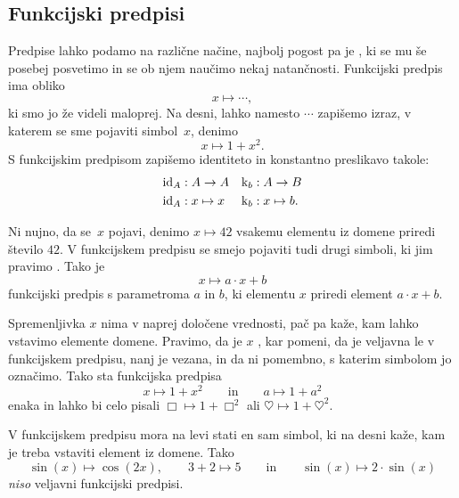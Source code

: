 \subsection{Funkcijski predpisi}
\label{sec:funkcijski-predpisi}

Predpise lahko podamo na različne načine, najbolj pogost pa je , ki
se mu še posebej posvetimo in se ob njem naučimo nekaj natančnosti. Funkcijski predpis ima
obliko
%
\begin{equation*}
  x \mapsto \cdots,
\end{equation*}
%
ki smo jo že videli maloprej. Na desni, lahko namesto $\cdots$ zapišemo izraz, v katerem
se sme pojaviti simbol~$x$, denimo
%
\begin{equation*}
  x \mapsto 1 + x^2.
\end{equation*}
%
S funkcijskim predpisom zapišemo identiteto in konstantno preslikavo takole:
%
\begin{align*}
  \id[A] &: A \to A
  &
  \konst{b} &: A \to B
  \\
  \id[A] &: x \mapsto x
  &
  \konst{b} &: x \mapsto b.
\end{align*}

Ni nujno, da se~$x$ pojavi, denimo $x \mapsto 42$ vsakemu elementu iz domene priredi
število $42$. V funkcijskem predpisu se smejo pojaviti tudi drugi simboli, ki jim
pravimo . Tako je
%
\begin{equation*}
  x \mapsto a \cdot x + b
\end{equation*}
%
funkcijski predpis s parametroma $a$ in $b$, ki elementu $x$ priredi element $a \cdot x + b$.

Spremenljivka $x$ nima v naprej določene vrednosti, pač pa kaže, kam lahko vstavimo
elemente domene. Pravimo, da je $x$ , kar pomeni, da je veljavna
le v funkcijskem predpisu, nanj je vezana, in da ni pomembno, s katerim simbolom jo
označimo. Tako sta funkcijska predpisa
%
\begin{equation*}
  x \mapsto 1 + x^2
  \qquad\text{in}\qquad
  a \mapsto 1 + a^2
\end{equation*}
%
enaka in lahko bi celo pisali $\Box \mapsto 1 + \Box^2$ ali
$\heartsuit \mapsto 1 + \heartsuit^2$.

V funkcijskem predpisu mora na levi stati en sam simbol, ki na desni kaže, kam je treba
vstaviti element iz domene. Tako
%
\begin{equation*}
  \sin(x) \mapsto \cos(2 x),
  \qquad
  3 + 2 \mapsto 5
  \qquad\text{in}\qquad
  \sin(x) \mapsto 2 \cdot \sin(x)
\end{equation*}
%
\emph{niso} veljavni funkcijski predpisi.

